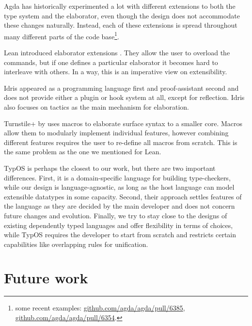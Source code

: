 Agda has historically experimented a lot with different extensions to
both the type system and the elaborator, even though the design does not
accommodate these changes naturally. Instead, each of these extensions
is spread throughout many different parts of the code base\footnote{some
  recent examples:
  \href{https://github.com/agda/agda/pull/6385}{github.com/agda/agda/pull/6385},
  \href{https://github.com/agda/agda/pull/6354}{github.com/agda/agda/pull/6354}.}.

Lean introduced elaborator extensions
\citep{leonardodemouraLeanMetaprogramming2021, ullrichNotationsHygienicMacro2020}.
They allow the user to overload the commands, but if one defines a
particular elaborator it becomes hard to interleave with others. In a
way, this is an imperative view on extensibility.

Idris
\citep{bradyIdrisGeneralpurposeDependently2013, christiansenElaboratorReflectionExtending2016}
appeared as a programming language first and proof-assistant second and
does not provide either a plugin or hook system at all, except for
reflection. Idris also focuses on tactics as the main mechanism for
elaboration.

Turnstile+ by \citet{changDependentTypeSystems2019} uses macros to
elaborate surface syntax to a smaller core. Macros allow them to
modularly implement individual features, however combining different
features requires the user to re-define all macros from scratch. This is
the same problem as the one we mentioned for Lean.

TypOS \citep{allaisTypOSOperatingSystem2022a, guillaumeallaisTypOS2022}
is perhaps the closest to our work, but there are two important
differences. First, it is a domain-specific language for building
type-checkers, while our design is language-agnostic, as long as the
host language can model extensible datatypes in some capacity. Second,
their approach settles features of the language as they are decided by
the main developer and does not concern future changes and evolution.
Finally, we try to stay close to the designs of existing dependently
typed languages and offer flexibility in terms of choices, while TypOS
requires the developer to start from scratch and restricts certain
capabilities like overlapping rules for unification.

\hypertarget{future-work}{%
\section{Future work}\label{future-work}}

